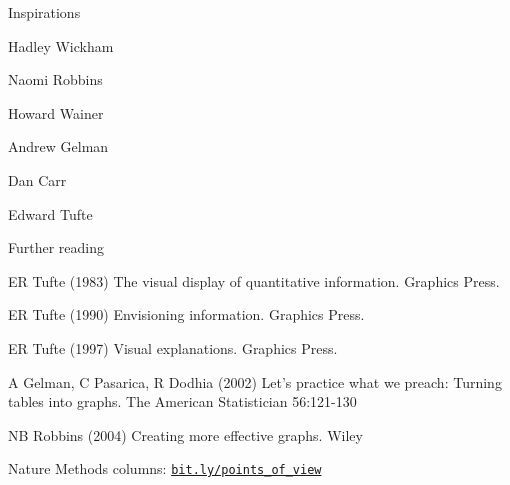 \documentclass[aspectratio=169,12pt,t]{beamer}
\begin{document}
\begin{frame}{Inspirations}


\bbi
\item Hadley Wickham

\item Naomi Robbins

\item Howard Wainer

\item Andrew Gelman

\item Dan Carr

\item Edward Tufte
  \ei


  \note{
  }
\end{frame}





\begin{frame}{Further reading}

\vspace{-12pt}

  \bbi
\item ER Tufte (1983) The visual display of quantitative information.
Graphics Press.
\item ER Tufte (1990) Envisioning information. Graphics Press.
\item ER Tufte (1997) Visual explanations. Graphics Press.

\vspace{12pt}

\item A Gelman, C Pasarica, R Dodhia (2002) Let's practice what we preach:
Turning tables into graphs. The American Statistician 56:121-130

\vspace{12pt}

\item NB Robbins (2004) Creating more effective graphs. Wiley

\vspace{12pt}

\item Nature Methods columns: \href{https://bit.ly/points_of_view}{\tt bit.ly/points\_of\_view}
\ei

\note{
}
\end{frame}
\end{document}
